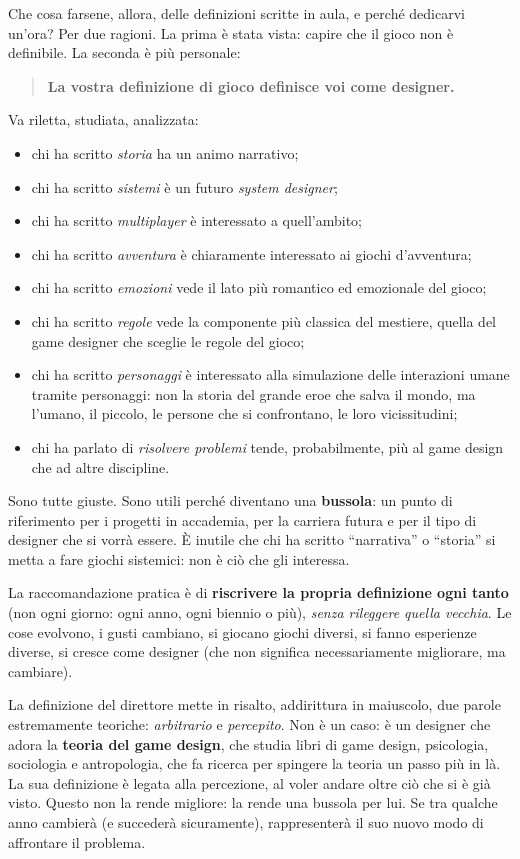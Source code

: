 Che cosa farsene, allora, delle definizioni scritte in aula, e perché
dedicarvi un'ora? Per due ragioni. La prima è stata vista: capire che il gioco
non è definibile. La seconda è più personale:
\begin{quote}
\textbf{La vostra definizione di gioco definisce voi come designer.}
\end{quote}
Va riletta, studiata, analizzata:
\begin{itemize}
  \item chi ha scritto \emph{storia} ha un animo narrativo;
  \item chi ha scritto \emph{sistemi} è un futuro \emph{system designer};
  \item chi ha scritto \emph{multiplayer} è interessato a quell'ambito;
  \item chi ha scritto \emph{avventura} è chiaramente interessato ai giochi
        d'avventura;
  \item chi ha scritto \emph{emozioni} vede il lato più romantico ed
        emozionale del gioco;
  \item chi ha scritto \emph{regole} vede la componente più classica del
        mestiere, quella del game designer che sceglie le regole del gioco;
  \item chi ha scritto \emph{personaggi} è interessato alla simulazione delle
        interazioni umane tramite personaggi: non la storia del grande eroe
        che salva il mondo, ma l'umano, il piccolo, le persone che si
        confrontano, le loro vicissitudini;
  \item chi ha parlato di \emph{risolvere problemi} tende, probabilmente, più
        al game design che ad altre discipline.
\end{itemize}
Sono tutte giuste. Sono utili perché diventano una \textbf{bussola}: un punto
di riferimento per i progetti in accademia, per la carriera futura e per il
tipo di designer che si vorrà essere. È inutile che chi ha scritto
``narrativa'' o ``storia'' si metta a fare giochi sistemici: non è ciò che gli
interessa.

La raccomandazione pratica è di \textbf{riscrivere la propria definizione
ogni tanto} (non ogni giorno: ogni anno, ogni biennio o più), \emph{senza
rileggere quella vecchia}. Le cose evolvono, i gusti cambiano, si giocano
giochi diversi, si fanno esperienze diverse, si cresce come designer (che non
significa necessariamente migliorare, ma cambiare).

La definizione del direttore mette in risalto, addirittura in maiuscolo, due
parole estremamente teoriche: \emph{arbitrario} e \emph{percepito}. Non è un
caso: è un designer che adora la \textbf{teoria del game design}, che studia
libri di game design, psicologia, sociologia e antropologia, che fa ricerca
per spingere la teoria un passo più in là. La sua definizione è legata alla
percezione, al voler andare oltre ciò che si è già visto. Questo non la rende
migliore: la rende una bussola per lui. Se tra qualche anno cambierà (e
succederà sicuramente), rappresenterà il suo nuovo modo di affrontare il
problema.

